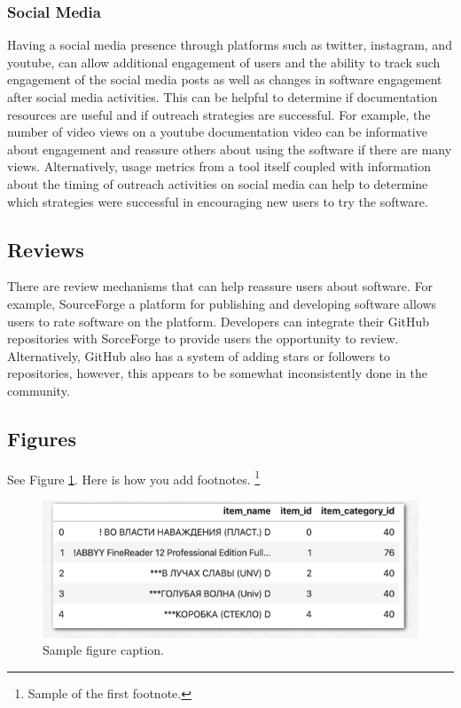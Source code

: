 \documentclass{article}
\begin{document}
\subsubsection{Social Media}
Having a social media presence through platforms such as twitter, instagram, and youtube, can allow additional engagement of users and the ability to track such engagement of the social media posts as well as changes in software engagement after social media activities. This can be helpful to determine if documentation resources are useful and if outreach strategies are successful. For example, the number of video views on a youtube documentation video can be informative about engagement and reassure others about using the software if there are many views. Alternatively, usage metrics from a tool itself coupled with information about the timing of outreach activities on social media can help to determine which strategies were successful in encouraging new users to try the software.

\subsection{Reviews}
There are review mechanisms that can help reassure users about software. For example, SourceForge\cite{sourceforge} a platform for publishing and developing software allows users to rate software on the platform. Developers can integrate their GitHub repositories with SorceForge to provide users the opportunity to review. Alternatively, GitHub also has a system of adding stars or followers to repositories, however, this appears to be somewhat inconsistently done in the community. 
\subsection{Figures}

See Figure \ref{fig:fig1}. Here is how you add footnotes. \footnote{Sample of the first footnote.}


\begin{figure} %
    \centering
    \includegraphics{test.png}
    \caption{Sample figure caption.}
    \label{fig:fig1}
\end{figure}
\end{document}
